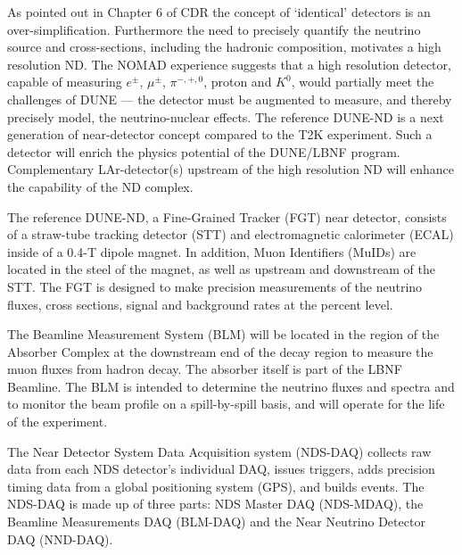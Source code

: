 As pointed out in Chapter 6 of CDR \volphys %
the concept of `identical' detectors is an over-simplification.
Furthermore the need to precisely quantify the neutrino source and
cross-sections, including the hadronic composition, motivates
a high resolution ND. The NOMAD experience suggests that a high
resolution detector, capable of measuring $e^{\pm}$, $\mu^{\pm}$,
$\pi^{-,+,0}$, proton and $K^{0}$, would partially meet the
challenges of DUNE --- the detector must be augmented to measure, and
thereby precisely model, the neutrino-nuclear effects. The reference
DUNE-ND is a next generation of near-detector concept
compared to the T2K experiment. Such a detector will
enrich the physics potential of the DUNE/LBNF program.  Complementary
LAr-detector(s) upstream of the high resolution ND will enhance the
capability of the ND complex.


The reference DUNE-ND, a Fine-Grained Tracker (FGT) near detector,
consists of a straw-tube tracking detector (STT) and electromagnetic
calorimeter (ECAL) inside of a 0.4-T dipole magnet. In addition, Muon
Identifiers (MuIDs) are located in the steel of the magnet, as well as
upstream and downstream of the STT. The FGT is designed to make
precision measurements of the neutrino fluxes, cross sections, signal
and background rates at the percent level.

The Beamline Measurement System (BLM) will be located in the region of
the Absorber Complex at the downstream end of the decay region to
measure the muon fluxes from hadron decay. The absorber itself is part
of the LBNF Beamline.  The BLM is intended to determine the neutrino
fluxes and spectra and to monitor the beam profile on a spill-by-spill
basis, and will operate for the life of the experiment.

The Near Detector System Data Acquisition system (NDS-DAQ) collects
raw data from each NDS detector's individual DAQ, issues triggers,
adds precision timing data from a global positioning system (GPS), and
builds events.  The NDS-DAQ is made up of three parts: NDS Master DAQ
(NDS-MDAQ), the Beamline Measurements DAQ (BLM-DAQ) and the Near
Neutrino Detector DAQ (NND-DAQ).
